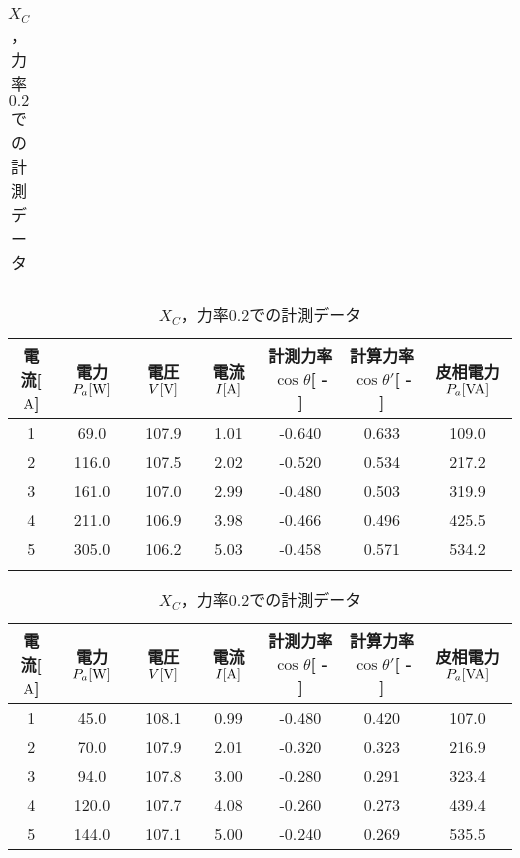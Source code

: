 \begin{table}[h]
\begin{tabular}{ccccccc}
\end{tabular}
	\caption{$X_{C}$，力率$0.4$での計測データ}
	\label{tab:0.4data2}
\begin{tabular}{ccccccc}
	\hline
	電流[$\rm{A}$] & 電力$P_a[\rm{W}]$ & 電圧$V[\rm{V}]$ & 電流$I[\rm{A}]$ & 計測力率$\cos \theta$[ - ] & 計算力率$\cos \theta '$[ - ] & 皮相電力$P_a[\rm{VA}]$ \\ \hline
	1 & 69.0  & 107.9 & 1.01 & -0.640 & 0.633 & 109.0 \\
	2 & 116.0 & 107.5 & 2.02 & -0.520 & 0.534 & 217.2 \\
	3 & 161.0 & 107.0 & 2.99 & -0.480 & 0.503 & 319.9 \\
	4 & 211.0 & 106.9 & 3.98 & -0.466 & 0.496 & 425.5 \\
	5 & 305.0 & 106.2 & 5.03 & -0.458 & 0.571 & 534.2 \\ \hline\\
\end{tabular}
	\caption{$X_{C}$，力率$0.2$での計測データ}
	\label{tab:0.2data2}
\begin{tabular}{ccccccc}
\hline
電流[$\rm{A}$] & 電力$P_a[\rm{W}]$ & 電圧$V[\rm{V}]$ & 電流$I[\rm{A}]$ & 計測力率$\cos \theta$[ - ] & 計算力率$\cos \theta '$[ - ] & 皮相電力$P_a[\rm{VA}]$ \\ \hline
1 & 45.0  & 108.1 & 0.99 & -0.480 & 0.420 & 107.0 \\
2 & 70.0  & 107.9 & 2.01 & -0.320 & 0.323 & 216.9 \\
3 & 94.0  & 107.8 & 3.00 & -0.280 & 0.291 & 323.4 \\
4 & 120.0 & 107.7 & 4.08 & -0.260 & 0.273 & 439.4 \\
5 & 144.0 & 107.1 & 5.00 & -0.240 & 0.269 & 535.5 \\ \hline
\end{tabular}
\end{table}
